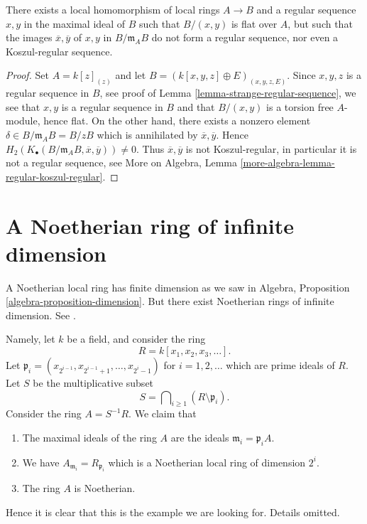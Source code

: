 \begin{lemma}
\label{lemma-base-change-regular-sequence}
There exists a local homomorphism of local rings $A \to B$
and a regular sequence $x, y$ in the maximal ideal of $B$ such that
$B/(x, y)$ is flat over $A$, but such that the images
$\overline{x}, \overline{y}$ of $x, y$ in $B/\mathfrak m_AB$ do not
form a regular sequence, nor even a Koszul-regular sequence.
\end{lemma}

\begin{proof}
Set $A = k[z]_{(z)}$ and let $B = (k[x, y, z] \oplus E)_{(x, y, z, E)}$.
Since $x, y, z$ is a regular sequence in $B$, see proof of
Lemma \ref{lemma-strange-regular-sequence},
we see that $x, y$ is a regular sequence in $B$ and that
$B/(x, y)$ is a torsion free $A$-module, hence flat.
On the other hand, there exists a nonzero element
$\delta \in B/\mathfrak m_AB = B/zB$ which is annihilated
by $\overline{x}, \overline{y}$. Hence
$H_2(K_\bullet(B/\mathfrak m_AB, \overline{x}, \overline{y})) \not = 0$.
Thus $\overline{x}, \overline{y}$ is not Koszul-regular, in particular
it is not a regular sequence, see
More on Algebra, Lemma \ref{more-algebra-lemma-regular-koszul-regular}.
\end{proof}





\section{A Noetherian ring of infinite dimension}
\label{section-Noetherian-infinite-dimension}

\noindent
A Noetherian local ring has finite dimension as we saw in
Algebra, Proposition \ref{algebra-proposition-dimension}.
But there exist Noetherian rings of infinite dimension.
See \cite[Appendix, Example 1]{Nagata}.

\medskip\noindent
Namely, let $k$ be a field, and consider the ring
$$
R = k[x_1, x_2, x_3, \ldots ].
$$
Let $\mathfrak p_i = (x_{2^{i - 1}}, x_{2^{i - 1} + 1}, \ldots, x_{2^i - 1})$
for $i = 1, 2, \ldots$ which are prime ideals of $R$. Let $S$
be the multiplicative subset
$$
S = \bigcap\nolimits_{i \geq 1} (R \setminus \mathfrak p_i).
$$
Consider the ring $A = S^{-1}R$.
We claim that
\begin{enumerate}
\item The maximal ideals of the ring $A$ are the ideals
$\mathfrak m_i = \mathfrak p_iA$.
\item We have $A_{\mathfrak m_i} = R_{\mathfrak p_i}$ which is
a Noetherian local ring of dimension $2^i$.
\item The ring $A$ is Noetherian.
\end{enumerate}
Hence it is clear that this is the example we are looking for.
Details omitted.





